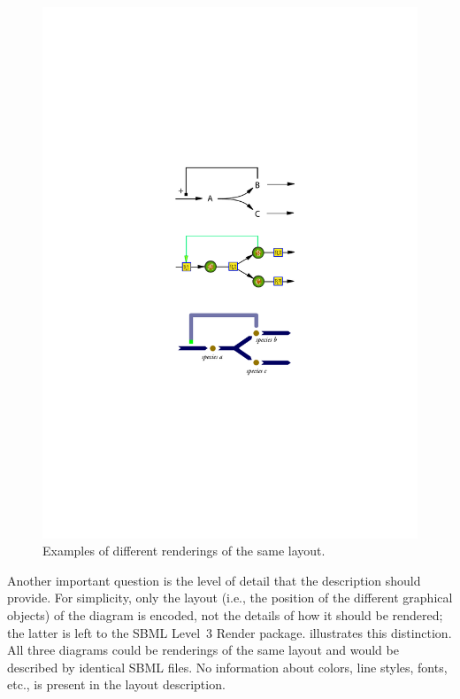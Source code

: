 \begin{figure}
\centering
\vspace*{-2em}
\hspace*{-1pt}\includegraphics[scale=0.87]{figures/layout1}
\vspace*{-1.75em}
\caption{Examples of different renderings of the same layout.}
\label{UML:All}
\label{figure:rendering}
\end{figure}

Another important question is the level of detail that the description 
should provide. For simplicity, only the layout (i.e., the position of 
the different graphical objects) of the diagram is encoded, not the 
details of how it should be rendered; the latter is left to the SBML Level~3 
Render package.
 illustrates this distinction. All three diagrams 
could be renderings of the same layout and would be described by 
identical SBML files. No information about colors, line styles, fonts, 
etc., is present in the layout description. 

